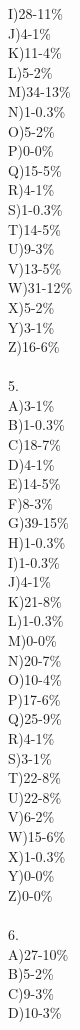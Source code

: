 \documentclass[letterpaper,10pt]{article}
\begin{document}
\begin{enumerate}
\begin{enumerate}
I)28-11\%\\
J)4-1\%\\
K)11-4\%\\
L)5-2\%\\
M)34-13\%\\
N)1-0.3\%\\
O)5-2\%\\
P)0-0\%\\
Q)15-5\%\\
R)4-1\%\\
S)1-0.3\%\\
T)14-5\%\\
U)9-3\%\\
V)13-5\%\\
W)31-12\%\\
X)5-2\%\\
Y)3-1\%\\
Z)16-6\%\\\\
5.\\
A)3-1\%\\
B)1-0.3\%\\
C)18-7\%\\
D)4-1\%\\
E)14-5\%\\
F)8-3\%\\
G)39-15\%\\
H)1-0.3\%\\
I)1-0.3\%\\
J)4-1\%\\
K)21-8\%\\
L)1-0.3\%\\
M)0-0\%\\
N)20-7\%\\
O)10-4\%\\
P)17-6\%\\
Q)25-9\%\\
R)4-1\%\\
S)3-1\%\\
T)22-8\%\\
U)22-8\%\\
V)6-2\%\\
W)15-6\%\\
X)1-0.3\%\\
Y)0-0\%\\
Z)0-0\%\\\\
6.\\
A)27-10\%\\
B)5-2\%\\
C)9-3\%\\
D)10-3\%\\

\end{enumerate}
\end{enumerate}
\end{document}
